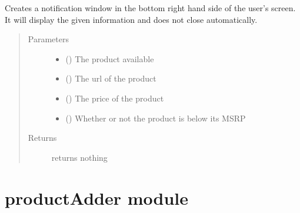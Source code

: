 \documentclass[letterpaper,10pt,english]{sphinxmanual}
\begin{document}

\begin{fulllineitems}
\label{\detokenize{interface:interface.notification}}
Creates a notification window in the bottom right hand side of the user’s
screen. It will display the given information and does not close
automatically.
\begin{quote}\begin{description}
\item[{Parameters}] \leavevmode\begin{itemize}
\item {} 
 () \textendash{} The product available

\item {} 
 () \textendash{} The url of the product

\item {} 
 () \textendash{} The price of the product

\item {} 
 () \textendash{} Whether or not the product is below its MSRP

\end{itemize}

\item[{Returns}] \leavevmode
returns nothing

\end{description}\end{quote}

\end{fulllineitems}



\section{productAdder module}
\label{\detokenize{productAdder:productadder-module}}\label{\detokenize{productAdder::doc}}
\end{document}
